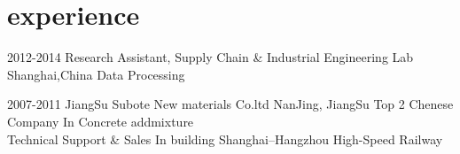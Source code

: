\documentclass[]{friggeri-cv} %
\begin{document}

\section{experience}

\begin{entrylist}

\entry
{2012-2014}
{Research Assistant, Supply Chain \& Industrial Engineering Lab}
{Shanghai,China}
{Data Processing}




\entry
{2007-2011}
{JiangSu Subote New materials Co.ltd}
{NanJing, JiangSu}
{Top 2 Chenese Company In Concrete addmixture\\
Technical Support \& Sales In building Shanghai–Hangzhou High-Speed Railway 
}
\end{entrylist}
\end{document}
